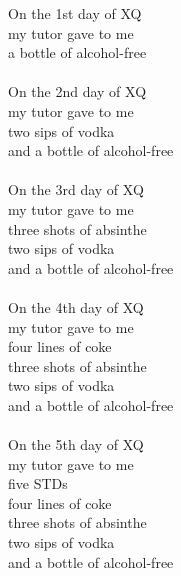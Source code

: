 
On the 1st day of XQ \\ my tutor gave to me \\ a bottle of alcohol-free \\ \hspace{10mm} \\ On the 2nd day of XQ \\ my tutor gave to me \\ two sips of vodka \\ and a bottle of alcohol-free \\ \hspace{10mm} \\ On the 3rd day of XQ \\ my tutor gave to me \\ three shots of absinthe \\ two sips of vodka \\ and a bottle of alcohol-free \\ \hspace{10mm} \\ On the 4th day of XQ \\ my tutor gave to me \\ four lines of coke \\ three shots of absinthe \\ two sips of vodka \\ and a bottle of alcohol-free \\ \hspace{10mm} \\ On the 5th day of XQ \\ my tutor gave to me \\ five STDs \\ four lines of coke \\ three shots of absinthe \\ two sips of vodka \\ and a bottle of alcohol-free